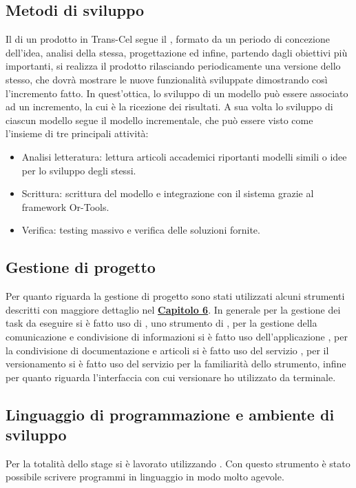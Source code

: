 \subsection{Metodi di sviluppo}
Il  di un prodotto in Trans-Cel segue il , formato da un periodo di concezione dell'idea, analisi della stessa, progettazione ed infine, partendo dagli obiettivi più importanti, si realizza il prodotto rilasciando periodicamente una versione dello stesso, che dovrà mostrare le nuove funzionalità sviluppate dimostrando così l'incremento fatto. In quest'ottica, lo sviluppo di un modello può essere associato ad un incremento, la cui  è la ricezione dei risultati.
A sua volta lo sviluppo di ciascun modello segue il modello incrementale, che può essere visto come l'insieme di tre principali attività:
\begin{itemize}
	\item Analisi letteratura: lettura articoli accademici riportanti modelli simili o idee per lo sviluppo degli stessi.
	\item Scrittura: scrittura del modello e integrazione con il sistema grazie al framework Or-Tools.
	\item Verifica: testing massivo e verifica delle soluzioni fornite.
\end{itemize}

\subsection{Gestione di progetto}
Per quanto riguarda la gestione di progetto sono stati utilizzati alcuni strumenti descritti con maggiore dettaglio nel \hyperlink{(chap:capitolo6)}{\textbf{Capitolo 6}}. In generale per la gestione dei task da eseguire si è fatto uso di , uno strumento di , per la gestione della comunicazione e condivisione di informazioni si è fatto uso dell'applicazione , per la condivisione di documentazione e articoli si è fatto uso del servizio , per il versionamento si è fatto uso del servizio  per la familiarità dello strumento, infine per quanto riguarda l'interfaccia con cui versionare ho utilizzato  da terminale.
	
\subsection{Linguaggio di programmazione e ambiente di sviluppo}
Per la totalità dello stage si è lavorato utilizzando . Con questo strumento è stato possibile scrivere programmi in linguaggio  in modo molto agevole. 

